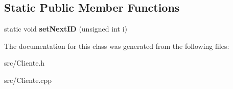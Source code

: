 \subsection*{Static Public Member Functions}
\begin{DoxyCompactItemize}
\item 
\hypertarget{class_cliente_a072628868d4165e0b7915d975621bc8a}{static void {\bfseries set\+Next\+I\+D} (unsigned int i)}\label{class_cliente_a072628868d4165e0b7915d975621bc8a}

\end{DoxyCompactItemize}


The documentation for this class was generated from the following files\+:\begin{DoxyCompactItemize}
\item 
src/Cliente.\+h\item 
src/Cliente.\+cpp\end{DoxyCompactItemize}

